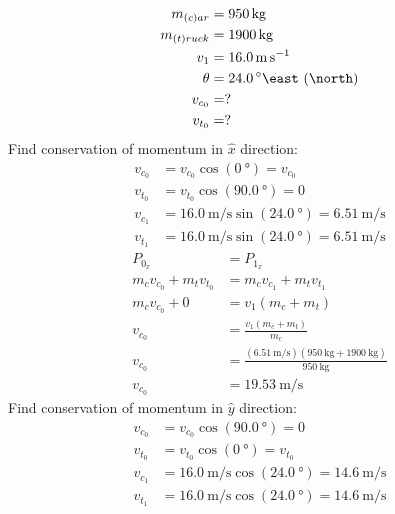 \documentclass{article}
\begin{document}
\begin{align*}
	m_{(c)ar} & = \SI{950}{\kilogram} \\
	m_{(t)ruck} & = \SI{1900}{\kilogram} \\
	v_1 & = \SI{16.0}{\meter \per \second} \\
	\theta & = \SI{24.0}{\degree \east \of \north} \\
	v_{c_0} & = ? \\
	v_{t_0} & = ?
\end{align*}
Find conservation of momentum in $ \hat{x} $ direction:
\begin{align*}
	v_{c_0} & = v_{c_0}\cos(\SI{0}{\degree}) = v_{c_0} \\
	v_{t_0} & = v_{t_0}\cos(\SI{90.0}{\degree}) = 0 \\
	v_{c_1} & = \SI{16.0}{\meter \per \second}\sin(\SI{24.0}{\degree}) = \SI{6.51}{\meter \per \second} \\
	v_{t_1} & = \SI{16.0}{\meter \per \second}\sin(\SI{24.0}{\degree}) = \SI{6.51}{\meter \per \second}
\end{align*}
\begin{align*}
	P_{0_x} & = P_{1_x} \\
	m_cv_{c_0} + m_tv_{t_0} & = m_cv_{c_1} + m_tv_{t_1} \\
	m_cv_{c_0} + 0 & = v_1 \left( m_c + m_t \right) \\
	v_{c_0} & = \frac{ v_1 \left( m_c + m_t \right) }{ m_c } \\
	v_{c_0} & = \frac{ (\SI{6.51}{\meter \per \second})(\SI{950}{\kilogram} + \SI{1900}{\kilogram}) }{ \SI{950}{\kilogram} } \\
	v_{c_0} & = \SI{19.53}{\meter \per \second}
\end{align*}
Find conservation of momentum in $ \hat{y} $ direction:
\begin{align*}
	v_{c_0} & = v_{c_0}\cos(\SI{90.0}{\degree}) = 0 \\
	v_{t_0} & = v_{t_0}\cos(\SI{0}{\degree}) = v_{t_0} \\
	v_{c_1} & = \SI{16.0}{\meter \per \second}\cos(\SI{24.0}{\degree}) = \SI{14.6}{\meter \per \second} \\
	v_{t_1} & = \SI{16.0}{\meter \per \second}\cos(\SI{24.0}{\degree}) = \SI{14.6}{\meter \per \second}
\end{align*}
\end{document}
